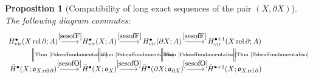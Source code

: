 \documentclass[12pt]{article}
\newtheorem{proposition}[theorem]{Proposition}
\theoremstyle{definition}
\theoremstyle{remark}
\numberwithin{equation}{subsection}
\newcommand{\oo}{\mathfrak o}
\newcommand{\cH}{\check H}
\newcommand{\vir}{\mathrm{vir}}
\newcommand{\rel}{\operatorname{rel}}
\begin{document}
\begin{proposition}[Compatibility of long exact sequences of the pair $(X,\partial X)$]\label{compatibilityoflongexactsequence}
The following diagram commutes:
\begin{equation}\label{compatibilityoflesdiagram}
\begin{tikzcd}
H^\bullet_\vir(X\rel\partial;A)\ar{r}{\eqref{sesofF}}\ar[equal]{d}{\text{Thm \ref{Fsheaffundamentaliso}}}&H^\bullet_\vir(X;A)\ar{r}{\eqref{sesofF}}\ar[equal]{d}{\text{Thm \ref{Fsheaffundamentaliso}}}&H^\bullet_\vir(\partial X;A)\ar{r}{\eqref{sesofF}}\ar[equal]{d}{\text{Thm \ref{Fsheaffundamentaliso}}}&H^{\bullet+1}_\vir(X\rel\partial;A)\ar[equal]{d}{\text{Thm \ref{Fsheaffundamentaliso}}}\\
\cH^\bullet(X;\oo_{X\rel\partial})\ar{r}{\eqref{sesofO}}&\cH^\bullet(X;\oo_X)\ar{r}{\eqref{sesofO}}&\cH^\bullet(\partial X;\oo_{\partial X})\ar{r}{\eqref{sesofO}}&\cH^{\bullet+1}(X;\oo_{X\rel\partial})
\end{tikzcd}
\end{equation}
\end{proposition}
\end{document}

